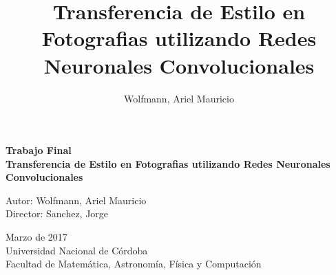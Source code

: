 \documentclass[a4paper,11pt,spanish]{book}
\title{Transferencia de Estilo en Fotografias utilizando Redes Neuronales Convolucionales}   %
\author{Wolfmann, Ariel Mauricio}             %
\begin{document}



\begin{titlepage}
  \begin{center}
  \vspace*{1in}
    \begin{Huge}
    \textbf{Trabajo Final}\\
    \textbf{Transferencia de Estilo en Fotografias utilizando Redes Neuronales Convolucionales} \\
    \end{Huge}
  \end{center}
  \begin{center}
    \begin{large}
      \vspace*{1in}
      Autor: Wolfmann, Ariel Mauricio\\
      Director: Sanchez, Jorge\\
    \end{large}
    \vspace*{0.15in}
     Marzo de 2017\\
    \vspace*{0.15in}
    Universidad Nacional de Córdoba\\
    \vspace*{0.15in}
    Facultad de Matemática, Astronomía, Física y Computación\\
    \vspace*{0.6in}
  \end{center}
\end{titlepage}

\end{document}
